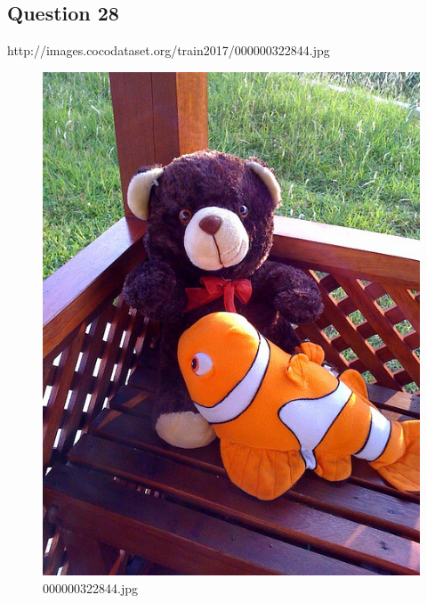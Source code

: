 \subsection*{Question 28}
    http://images.cocodataset.org/train2017/000000322844.jpg
    \begin{figure}[h]
        \centering
        \includegraphics[width=0.8\linewidth]{../image set/easy/000000322844.jpg}
        \caption{000000322844.jpg}
    \end{figure}

